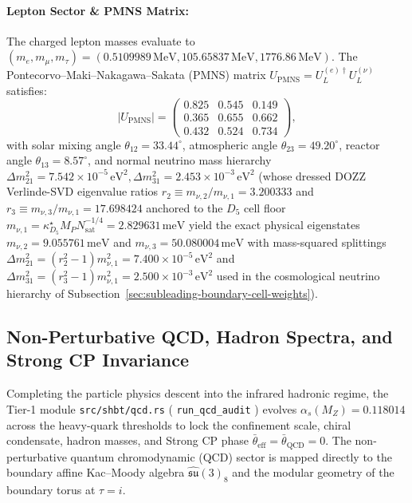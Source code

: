 \documentclass[11pt,letterpaper]{article}
\theoremstyle{plain}
\DeclareRobustCommand{\pyvar}[1]{%
  \ifmmode\text{\nolinkurl{#1}}\else\nolinkurl{#1}\fi%
}
\begin{document}
\paragraph{Lepton Sector \& PMNS Matrix:}
The charged lepton masses evaluate to $(m_e, m_\mu, m_\tau) = (0.5109989\,\mathrm{MeV}, 105.65837\,\mathrm{MeV}, 1776.86\,\mathrm{MeV})$. The Pontecorvo--Maki--Nakagawa--Sakata (PMNS) matrix $U_{\mathrm{PMNS}} = U_L^{(e)\dagger} U_L^{(\nu)}$ satisfies:
\begin{equation}
|U_{\mathrm{PMNS}}| = \begin{pmatrix}
0.825 & 0.545 & 0.149 \\
0.365 & 0.655 & 0.662 \\
0.432 & 0.524 & 0.734
\end{pmatrix},
\end{equation}
with solar mixing angle $\theta_{12} = 33.44^\circ$, atmospheric angle $\theta_{23} = 49.20^\circ$, reactor angle $\theta_{13} = 8.57^\circ$, and normal neutrino mass hierarchy $\Delta m_{21}^2 = 7.542 \times 10^{-5}\,\mathrm{eV}^2, \Delta m_{31}^2 = 2.453 \times 10^{-3}\,\mathrm{eV}^2$ (whose dressed DOZZ Verlinde-SVD eigenvalue ratios $r_2 \equiv m_{\nu,2}/m_{\nu,1} = 3.200333$ and $r_3 \equiv m_{\nu,3}/m_{\nu,1} = 17.698424$ anchored to the $D_5$ cell floor $m_{\nu,1} = \kappa_{D_5}^\star M_P N_{\text{sat}}^{-1/4} = 2.829631\,\mathrm{meV}$ yield the exact physical eigenstates $m_{\nu,2} = 9.055761\,\mathrm{meV}$ and $m_{\nu,3} = 50.080004\,\mathrm{meV}$ with mass-squared splittings $\Delta m_{21}^2 = (r_2^2 - 1)m_{\nu,1}^2 = 7.400 \times 10^{-5}\,\mathrm{eV}^2$ and $\Delta m_{31}^2 = (r_3^2 - 1)m_{\nu,1}^2 = 2.500 \times 10^{-3}\,\mathrm{eV}^2$ used in the cosmological neutrino hierarchy of Subsection~\ref{sec:subleading-boundary-cell-weights}).


\subsection{Non-Perturbative QCD, Hadron Spectra, and Strong CP Invariance}
\label{sec:non-perturbative-qcd-hadron-spectra}

Completing the particle physics descent into the infrared hadronic regime, the Tier-1 module \pyvar{src/shbt/qcd.rs} (\pyvar{run_qcd_audit}) evolves $\alpha_s(M_Z) = 0.118014$ across the heavy-quark thresholds to lock the confinement scale, chiral condensate, hadron masses, and Strong CP phase $\bar{\theta}_{\mathrm{eff}} = \bar{\theta}_{\mathrm{QCD}} = 0$.
The non-perturbative quantum chromodynamic (QCD) sector is mapped directly to the boundary affine Kac--Moody algebra $\widehat{\mathfrak{su}}(3)_8$ and the modular geometry of the boundary torus at $\tau = i$.
\end{document}
